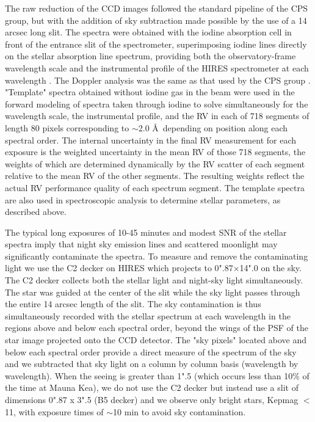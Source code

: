 \documentclass{emulateapj}
\begin{document}
The raw reduction of the CCD images followed the standard pipeline of
 the CPS group, but with the addition of sky subtraction made possible
 by the use of a 14 arcsec long slit.  The spectra were obtained with
 the iodine absorption cell in front of the entrance slit of the
 spectrometer, superimposing iodine lines directly on the stellar
 absorption line spectrum, providing both the observatory-frame
 wavelength scale and the instrumental profile of the HIRES
 spectrometer at each wavelength \citep{Marcy92}.  The Doppler
 analysis was the same as that used by the CPS group
 \citep{Johnson2010}. "Template" spectra obtained without iodine gas
 in the beam were used in the forward modeling of spectra taken
 through iodine to solve simultaneously for the wavelength scale, the
 instrumental profile, and the RV in each of 718 segments of length 80
 pixels corresponding to $\sim$2.0 \AA \ depending on position along
 each spectral order. The internal uncertainty in the final RV
 measurement for each exposure is the weighted uncertainty in the mean
 RV of those 718 segments, the weights of which are determined
 dynamically by the RV scatter of each segment relative to the mean RV
 of the other segments.  The resulting weights reflect the actual RV
 performance quality of each spectrum segment.  The template spectra
 are also used in spectroscopic analysis to determine stellar
 parameters, as described above.

  The typical long exposures of 10-45 minutes and modest SNR of the
 stellar spectra imply that night sky emission lines and scattered
 moonlight may significantly contaminate the spectra.  To measure and
 remove the contaminating light we use the C2 decker on HIRES which
 projects to 0".87$\times$14".0 on the sky. The C2 decker collects
 both the stellar light and night-sky light simultaneously. The star
 was guided at the center of the slit while the sky light passes
 through the entire 14 arcsec length of the slit.  The sky
 contamination is thus simultaneously recorded with the stellar
 spectrum at each wavelength in the regions above and below each
 spectral order, beyond the wings of the PSF of the star image
 projected onto the CCD detector.  The "sky pixels" located above and
 below each spectral order provide a direct measure of the spectrum of
 the sky and we subtracted that sky light on a column by column basis
 (wavelength by wavelength). When the seeing is greater than 1".5
 (which occurs less than 10\% of the time at Mauna Kea), we do not use
 the C2 decker but instead use a slit of dimensions 0".87 x 3".5 (B5
 decker) and we observe only bright stars, Kepmag $<$ 11, with
 exposure times of $\sim$10 min to avoid sky contamination.
\end{document}
